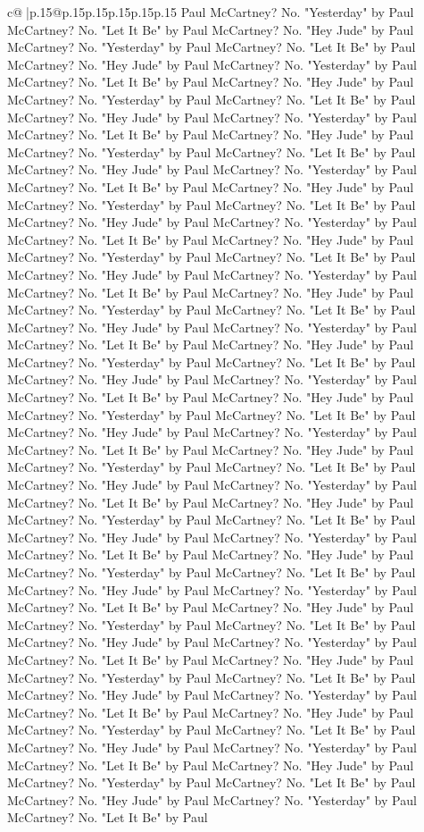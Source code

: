 \documentclass{article}
\begin{document}
{\begin{supertabular}{c@{$\;$}|p{.15\linewidth}@{}p{.15\linewidth}p{.15\linewidth}p{.15\linewidth}p{.15\linewidth}p{.15\linewidth}}
{{{Paul McCartney? No. "Yesterday" by Paul McCartney? No. "Let It Be" by Paul McCartney? No. "Hey Jude" by Paul McCartney? No. "Yesterday" by Paul McCartney? No. "Let It Be" by Paul McCartney? No. "Hey Jude" by Paul McCartney? No. "Yesterday" by Paul McCartney? No. "Let It Be" by Paul McCartney? No. "Hey Jude" by Paul McCartney? No. "Yesterday" by Paul McCartney? No. "Let It Be" by Paul McCartney? No. "Hey Jude" by Paul McCartney? No. "Yesterday" by Paul McCartney? No. "Let It Be" by Paul McCartney? No. "Hey Jude" by Paul McCartney? No. "Yesterday" by Paul McCartney? No. "Let It Be" by Paul McCartney? No. "Hey Jude" by Paul McCartney? No. "Yesterday" by Paul McCartney? No. "Let It Be" by Paul McCartney? No. "Hey Jude" by Paul McCartney? No. "Yesterday" by Paul McCartney? No. "Let It Be" by Paul McCartney? No. "Hey Jude" by Paul McCartney? No. "Yesterday" by Paul McCartney? No. "Let It Be" by Paul McCartney? No. "Hey Jude" by Paul McCartney? No. "Yesterday" by Paul McCartney? No. "Let It Be" by Paul McCartney? No. "Hey Jude" by Paul McCartney? No. "Yesterday" by Paul McCartney? No. "Let It Be" by Paul McCartney? No. "Hey Jude" by Paul McCartney? No. "Yesterday" by Paul McCartney? No. "Let It Be" by Paul McCartney? No. "Hey Jude" by Paul McCartney? No. "Yesterday" by Paul McCartney? No. "Let It Be" by Paul McCartney? No. "Hey Jude" by Paul McCartney? No. "Yesterday" by Paul McCartney? No. "Let It Be" by Paul McCartney? No. "Hey Jude" by Paul McCartney? No. "Yesterday" by Paul McCartney? No. "Let It Be" by Paul McCartney? No. "Hey Jude" by Paul McCartney? No. "Yesterday" by Paul McCartney? No. "Let It Be" by Paul McCartney? No. "Hey Jude" by Paul McCartney? No. "Yesterday" by Paul McCartney? No. "Let It Be" by Paul McCartney? No. "Hey Jude" by Paul McCartney? No. "Yesterday" by Paul McCartney? No. "Let It Be" by Paul McCartney? No. "Hey Jude" by Paul McCartney? No. "Yesterday" by Paul McCartney? No. "Let It Be" by Paul McCartney? No. "Hey Jude" by Paul McCartney? No. "Yesterday" by Paul McCartney? No. "Let It Be" by Paul McCartney? No. "Hey Jude" by Paul McCartney? No. "Yesterday" by Paul McCartney? No. "Let It Be" by Paul McCartney? No. "Hey Jude" by Paul McCartney? No. "Yesterday" by Paul McCartney? No. "Let It Be" by Paul McCartney? No. "Hey Jude" by Paul McCartney? No. "Yesterday" by Paul McCartney? No. "Let It Be" by Paul McCartney? No. "Hey Jude" by Paul McCartney? No. "Yesterday" by Paul McCartney? No. "Let It Be" by Paul McCartney? No. "Hey Jude" by Paul McCartney? No. "Yesterday" by Paul McCartney? No. "Let It Be" by Paul McCartney? No. "Hey Jude" by Paul McCartney? No. "Yesterday" by Paul McCartney? No. "Let It Be" by Paul McCartney? No. "Hey Jude" by Paul McCartney? No. "Yesterday" by Paul McCartney? No. "Let It Be" by Paul McCartney? No. "Hey Jude" by Paul McCartney? No. "Yesterday" by Paul McCartney? No. "Let It Be" by Paul McCartney? No. "Hey Jude" by Paul McCartney? No. "Yesterday" by Paul McCartney? No. "Let It Be" by Paul McCartney? No. "Hey Jude" by Paul McCartney? No. "Yesterday" by Paul McCartney? No. "Let It Be" by Paul McCartney? No. "Hey Jude" by Paul McCartney? No. "Yesterday" by Paul McCartney? No. "Let It Be" by Paul }}}
\end{supertabular}}
\end{document}
